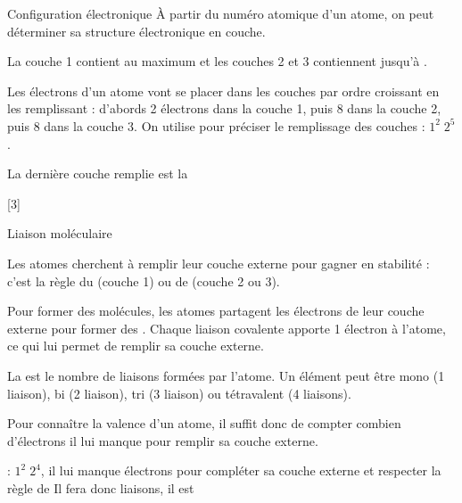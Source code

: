\begin{doc}{Configuration électronique}
  À partir du numéro atomique d'un atome, on peut déterminer sa structure électronique en couche.
  
  \begin{importants}
    La couche 1 contient au maximum  et les couches 2 et 3 contiennent jusqu'à .
  \end{importants}
  Les électrons d'un atome vont se placer dans les couches par ordre croissant en les remplissant : d'abords 2 électrons dans la couche 1, puis 8 dans la couche 2, puis 8 dans la couche 3.
  On utilise  pour préciser le remplissage des couches
  \exemple {} : $1^2\; 2^5$. 
  \begin{importants}
    La dernière couche remplie est la 
  \end{importants}
  
\end{doc}

[3]


\begin{doc}{Liaison moléculaire}
  \begin{importants}
    Les atomes cherchent à remplir leur couche externe pour gagner en stabilité : c'est la règle du  (couche 1) ou de  (couche 2 ou 3).
  \end{importants}
  
  \begin{importants}
    Pour former des molécules, les atomes partagent les électrons de leur couche externe pour former des .
    Chaque liaison covalente apporte 1 électron à l'atome, ce qui lui permet de remplir sa couche externe.
  \end{importants}
  \begin{importants}
    La  est le nombre de liaisons formées par l'atome.
    Un élément peut être mono (1 liaison), bi (2 liaison), tri (3 liaison) ou tétravalent (4 liaisons).
  \end{importants}
  Pour connaître la valence d'un atome, il suffit donc de compter combien d'électrons il lui manque pour remplir sa couche externe.

  \exemple {} : $1^2\; 2^4$,
  il lui manque  électrons pour compléter sa couche externe et respecter la règle de 
  Il fera donc  liaisons, il est 
\end{doc}

